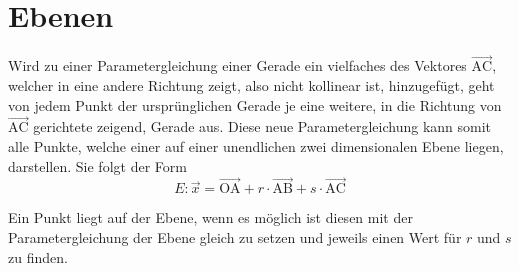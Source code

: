 \documentclass{article}
\begin{document}
 
\newcommand{\vect}[1]{\overrightarrow{#1}} 
\newcommand{\vectp}[1]{\vect{\mathrm{#1}}}
 
\noindent \begin{minipage}[t]{\dimexpr\textwidth-6cm}
 \vspace{0pt}  
 \section{Ebenen}
 Wird zu einer Parametergleichung einer Gerade ein vielfaches des Vektores $\vectp{AC}$, welcher in eine andere Richtung zeigt, also nicht kollinear ist, hinzugefügt, geht von jedem Punkt der ursprünglichen Gerade je eine weitere, in die Richtung von $\vectp{AC}$ gerichtete zeigend, Gerade aus.
 Diese neue Parametergleichung kann somit alle Punkte, welche einer auf einer unendlichen zwei dimensionalen Ebene liegen, darstellen. \newline
 Sie folgt der Form  
 \[
  E: \vect{x} = \vectp{OA} + r \cdot \vectp{AB} + s \cdot \vectp{AC} 
 \]
\end{minipage}
\hfill
\begin{minipage}[t]{6cm}
  \centering
\end{minipage}
 
\vspace{1em}  
\noindent Ein Punkt liegt auf der Ebene, wenn es möglich ist diesen mit der Parametergleichung der Ebene gleich zu setzen und jeweils einen Wert für $r$ und $s$ zu finden.
 
\end{document}
